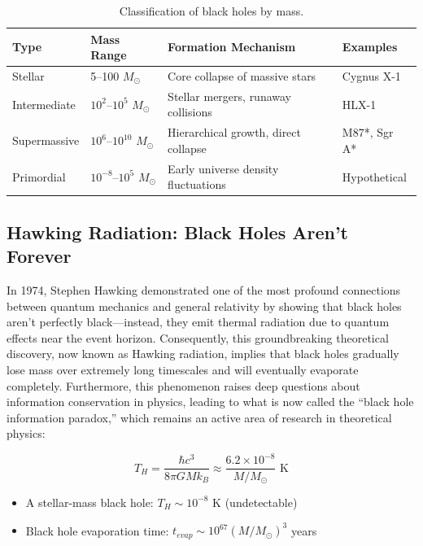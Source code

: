 \documentclass[11pt,a4paper]{article}
\newcommand{\msun}{M_\odot}
\begin{document}
\begin{table}[H]
\centering
\caption{Classification of black holes by mass.}
\label{tab:bh_classification}
\begin{tabular}{|l|l|l|l|}
\hline
\textbf{Type} & \textbf{Mass Range} & \textbf{Formation Mechanism} & \textbf{Examples} \\
\hline
Stellar & 5--100 $\msun$ & Core collapse of massive stars & Cygnus X-1 \\
Intermediate & $10^2$--$10^5$ $\msun$ & Stellar mergers, runaway collisions & HLX-1 \\
Supermassive & $10^6$--$10^{10}$ $\msun$ & Hierarchical growth, direct collapse & M87*, Sgr A* \\
Primordial & $10^{-8}$--$10^5$ $\msun$ & Early universe density fluctuations & Hypothetical \\
\hline
\end{tabular}
\end{table}

\subsection{Hawking Radiation: Black Holes Aren't Forever}

In 1974, Stephen Hawking demonstrated one of the most profound connections between quantum mechanics and general relativity by showing that black holes aren't perfectly black---instead, they emit thermal radiation due to quantum effects near the event horizon. Consequently, this groundbreaking theoretical discovery, now known as Hawking radiation, implies that black holes gradually lose mass over extremely long timescales and will eventually evaporate completely. Furthermore, this phenomenon raises deep questions about information conservation in physics, leading to what is now called the ``black hole information paradox,'' which remains an active area of research in theoretical physics:

\begin{equationbox}
\begin{equation}
T_H = \frac{\hbar c^3}{8\pi G M k_B} \approx \frac{6.2 \times 10^{-8}}{M/\msun} \text{ K}
\label{eq:hawking_temp}
\end{equation}
\end{equationbox}

\begin{itemize}[noitemsep]
    \item A stellar-mass black hole: $T_H \sim 10^{-8}$ K (undetectable)
    \item Black hole evaporation time: $t_{evap} \sim 10^{67} (M/\msun)^3$ years
\end{itemize}
\end{document}
